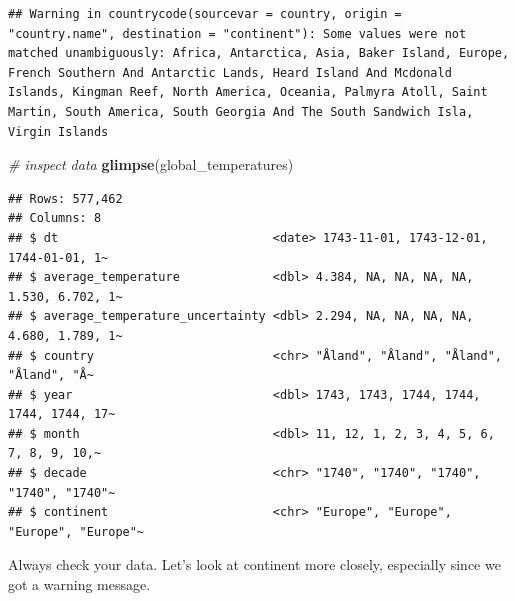 \documentclass[
]{book}
\newenvironment{Shaded}{\begin{snugshade}}{\end{snugshade}}
\newcommand{\CommentTok}[1]{\textcolor[rgb]{0.56,0.35,0.01}{\textit{#1}}}
\newcommand{\KeywordTok}[1]{\textcolor[rgb]{0.13,0.29,0.53}{\textbf{#1}}}
\newcommand{\NormalTok}[1]{#1}
\newcommand{\OperatorTok}[1]{\textcolor[rgb]{0.81,0.36,0.00}{\textbf{#1}}}
\newcommand{\StringTok}[1]{\textcolor[rgb]{0.31,0.60,0.02}{#1}}
\begin{document}
\begin{verbatim}
## Warning in countrycode(sourcevar = country, origin = "country.name", destination = "continent"): Some values were not matched unambiguously: Africa, Antarctica, Asia, Baker Island, Europe, French Southern And Antarctic Lands, Heard Island And Mcdonald Islands, Kingman Reef, North America, Oceania, Palmyra Atoll, Saint Martin, South America, South Georgia And The South Sandwich Isla, Virgin Islands
\end{verbatim}

\begin{Shaded}
\begin{Highlighting}[]
\CommentTok{# inspect data}
\KeywordTok{glimpse}\NormalTok{(global_temperatures)}
\end{Highlighting}
\end{Shaded}

\begin{verbatim}
## Rows: 577,462
## Columns: 8
## $ dt                              <date> 1743-11-01, 1743-12-01, 1744-01-01, 1~
## $ average_temperature             <dbl> 4.384, NA, NA, NA, NA, 1.530, 6.702, 1~
## $ average_temperature_uncertainty <dbl> 2.294, NA, NA, NA, NA, 4.680, 1.789, 1~
## $ country                         <chr> "Åland", "Åland", "Åland", "Åland", "Å~
## $ year                            <dbl> 1743, 1743, 1744, 1744, 1744, 1744, 17~
## $ month                           <dbl> 11, 12, 1, 2, 3, 4, 5, 6, 7, 8, 9, 10,~
## $ decade                          <chr> "1740", "1740", "1740", "1740", "1740"~
## $ continent                       <chr> "Europe", "Europe", "Europe", "Europe"~
\end{verbatim}

Always check your data. Let's look at continent more closely, especially since we got a warning message.

\begin{Shaded}
\end{Shaded}
\end{document}
